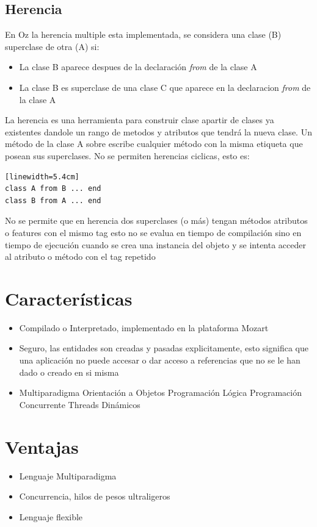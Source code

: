 \documentclass[10pt,journal,compsoc]{IEEEtran}
\begin{document}
\subsection{Herencia}
En Oz la herencia multiple esta implementada, se considera una clase (B) superclase de otra (A) si:
\begin{itemize}
	\item La clase B aparece despues de la declaraci\'on \emph{from} de la clase A
	\item La clase B es superclase de una clase C que aparece en la declaracion \emph{from} de la clase A
\end{itemize}
La herencia es una herramienta para construir clase apartir de clases ya existentes dandole un rango de metodos y atributos que tendr\'a la nueva clase. Un m\'etodo de la clase A sobre escribe cualquier m\'etodo con la misma etiqueta que posean sus superclases. No se permiten herencias ciclicas, esto es:
\begin{lstlisting}[language=Oz, caption = {Variables en un scope}][linewidth=5.4cm]
class A from B ... end 
class B from A ... end
\end{lstlisting}
No se permite que en herencia dos superclases (o m\'as) tengan m\'etodos atributos o features con el mismo tag esto no se evalua en tiempo de compilación sino en tiempo de ejecuci\'on cuando se crea una instancia del objeto y se intenta acceder al atributo o m\'etodo con el tag repetido 

\section{Caracter\'isticas}
\begin{itemize}
	\item Compilado o Interpretado, implementado en la plataforma Mozart
	\item Seguro, las entidades son creadas y pasadas explicitamente, esto significa que una aplicaci\'on no puede accesar o dar acceso a referencias que no se le han dado o creado en si misma
	\item Multiparadigma
		\subitem Orientaci\'on a Objetos
		\subitem Programaci\'on L\'ogica
		\subitem Programaci\'on Concurrente
			\subsubitem Threads Din\'amicos
\end{itemize}

\section{Ventajas}
\begin{itemize}
	\item Lenguaje Multiparadigma
	\item Concurrencia, hilos de pesos ultraligeros
	\item Lenguaje flexible
\end{itemize}
\end{document}

